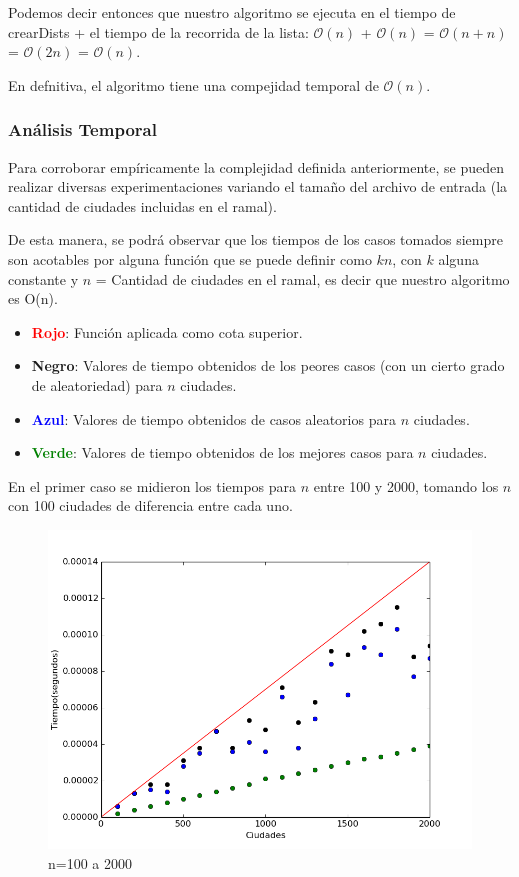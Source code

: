 \documentclass[spanish,a4paper]{article}
\begin{document}
Podemos decir entonces que nuestro algoritmo se ejecuta en el tiempo de crearDists + el tiempo de la recorrida de la lista: $\mathcal{O}(n)$ + $\mathcal{O}(n)$ = $\mathcal{O}(n+n)$ = $\mathcal{O}(2n)$ = $\mathcal{O}(n)$.

En defnitiva, el algoritmo tiene una compejidad temporal de $\mathcal{O}(n)$.

\subsubsection{Análisis Temporal}

Para corroborar empíricamente la complejidad definida anteriormente, se pueden realizar diversas experimentaciones variando el tamaño del archivo de entrada (la cantidad de ciudades incluidas en el ramal).

De esta manera, se podrá observar que los tiempos de los casos tomados siempre son acotables por alguna función que se puede definir como $kn$, con $k$ alguna constante y $n$ = Cantidad de ciudades en el ramal, es decir que nuestro algoritmo es O(n).

\begin{itemize}
\item \textbf{\textcolor{red}{Rojo}}: Función aplicada como cota superior.
\item \textbf{Negro}: Valores de tiempo obtenidos de los peores casos (con un cierto grado de aleatoriedad) para $n$ ciudades.
\item \textbf{\textcolor{blue}{Azul}}: Valores de tiempo obtenidos de casos aleatorios para $n$ ciudades.
\item \textbf{\textcolor{green}{Verde}}: Valores de tiempo obtenidos de los mejores casos para $n$ ciudades.
\end{itemize}

En el primer caso se midieron los tiempos para $n$ entre 100 y 2000, tomando los $n$ con 100 ciudades de diferencia entre cada uno.

\begin{figure}[H]
\centering
\includegraphics[width=450pt]{ej1_100a2000.png}
\caption{n=100 a 2000}
\end{figure}
\end{document}
